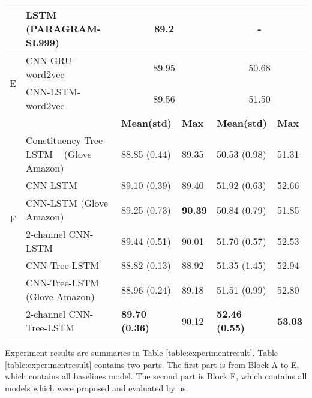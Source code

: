 \begin{table*}[]
\begin{tabular}{|c|l|ll|ll|}
		& LSTM (PARAGRAM-SL999)~\cite{wieting2015towards} & \multicolumn{2}{c|}{89.2} & \multicolumn{2}{c|}{-}
		\\
		\hline
		\multirow{2}{*}{E}  & CNN-GRU-word2vec~\cite{cnn-rnn}                    &\multicolumn{2}{c|}{89.95} & \multicolumn{2}{c|}{50.68} \\
		& CNN-LSTM-word2vec~\cite{cnn-rnn}   &       \multicolumn{2}{c|}{89.56} & \multicolumn{2}{c|}{51.50} \Bstrut    \\
		\Xhline{3\arrayrulewidth}
		\Xhline{3\arrayrulewidth}
		&   & \textbf{Mean(std)} & \textbf{Max} & \textbf{Mean(std)} & \textbf{Max}  \\
		\cline{3-6}
		\multirow{6}{*}{F} & Constituency Tree-LSTM ~\cite{treeLSTM} (Glove Amazon) & 88.85 (0.44) & 89.35 & 50.53 (0.98) & 51.31 \Tstrut \\
		& CNN-LSTM                                 & 89.10 (0.39)  & 89.40 & 51.92 (0.63) & 52.66 \\
		& CNN-LSTM (Glove Amazon) & 89.25 (0.73) & \textbf{90.39}  & 50.84 (0.79) & 51.85 \\
		& 2-channel CNN-LSTM                        & 89.44    (0.51) & 90.01 & 51.70 (0.57) & 52.53 \\
		& CNN-Tree-LSTM                            & 88.82 (0.13) & 88.92 & 51.35 (1.45) & 52.94 \\
		& CNN-Tree-LSTM (Glove Amazon)             & 88.96 (0.24) & 89.18 & 51.51 (0.99) & 52.80 \\
		& 2-channel CNN-Tree-LSTM  & \textbf{89.70 (0.36)} & 90.12  & \textbf{52.46 (0.55)} & \textbf{53.03} \Bstrut  \\
		\hline
	\end{tabular}
\end{table*}
Experiment results are summaries in Table \ref{table:experimentresult}.
Table \ref{table:experimentresult} contains two parts.
The first part is from Block A to E, which contains all baselines model.
The second part is Block F, which contains all models which were proposed and evaluated by us.
